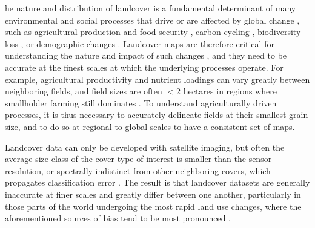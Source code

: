 \documentclass{pnastwo}
\begin{document}
\begin{article}
\begin{abstract}
{Blah blah.}
\end{abstract}


\linenumbers

he nature and distribution of landcover is a fundamental determinant of many environmental and social processes that drive or are affected by global change \cite{lambin_modelling_1997}, such as agricultural production and food security \cite{lark_cropland_2015,wright_recent_2013, licker_mind_2010}, carbon cycling \cite{asner_high-resolution_2010,gaveau_major_2014}, biodiversity loss \cite{newbold_global_2015,luoto_predicting_2004}, or demographic changes \cite{linard_assessing_2010}. Landcover maps are therefore critical for understanding the nature and impact of such changes \cite{see_improved_2015}, and they need to be accurate at the finest scales at which the underlying processes operate. For example, agricultural productivity and nutrient loadings can vary greatly between neighboring fields, and field sizes are often $<$2 hectares in regions where smallholder farming still dominates \cite{jain_mapping_2013, debats_generalized_????}. To understand agriculturally driven processes, it is thus necessary to accurately delineate fields at their smallest grain size, and to do so at regional to global scales to have a consistent set of maps.   

Landcover data can only be developed with satellite imaging, but often the average size class of the cover type of interest is smaller than the sensor resolution, or spectrally indistinct from other neighboring covers, which propagates classification error \cite{see_improved_2015,lobell_use_2013,estes_diylandcover:_2015}. The result is that landcover datasets are generally inaccurate at finer scales and greatly differ between one another, particularly in those parts of the world undergoing the most rapid land use changes, where the aforementioned sources of bias tend to be most pronounced \cite{estes_projected_2013,fritz_comparison_2010,fritz_cropland_2011}.  


\end{article}
\end{document}

